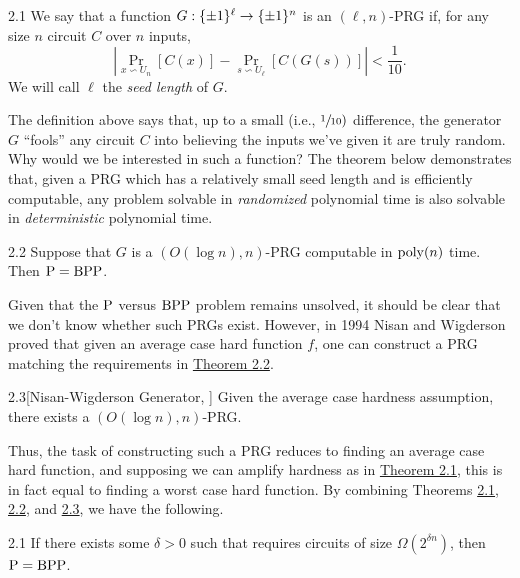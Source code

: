 \documentclass[11pt]{article}
\begin{document}
\begin{definition}{2.1}
    We say that a function $G : \pmo^\ell \rightarrow \pmo^{n}$ is an $(\ell, n)$-PRG if, for any size $n$ circuit $C$ over $n$ inputs, 
    \begin{equation*}
        \left|\Pr_{x \backsim U_n}[C(x)] - \Pr_{s \backsim U_\ell}[C(G(s))]\right| < \frac{1}{10}.
    \end{equation*}
    We will call $\ell$ the \emph{seed length} of $G$.
\end{definition}

The definition above says that, up to a small (i.e., $\sfrac{1}{10})$ difference, the generator $G$ ``fools'' any circuit $C$ into believing the inputs we've given it are truly random. Why would we be interested in such a function? The theorem below demonstrates that, given a PRG which has a relatively small seed length and is efficiently computable, any problem solvable in \emph{randomized} polynomial time is also solvable in \emph{deterministic} polynomial time.

\begin{theorem}{2.2} \label{t-2-2}
    Suppose that $G$ is a $(O(\log n), n)$-PRG computable in $\poly(n)$ time. Then $\P = \BPP$.
\end{theorem}

Given that the $\P$ versus $\BPP$ problem remains unsolved, it should be clear that we don't know whether such PRGs exist. However, in 1994 Nisan and Wigderson \cite{NW94} proved that given an average case hard function $f$, one can construct a PRG matching the requirements in \hyperref[t-2-2]{Theorem 2.2}.

\begin{theorem}{2.3}[Nisan-Wigderson Generator, \cite{NW94}] \label{t-2-3}
    Given the average case hardness assumption, there exists a $(O(\log n), n)$-PRG.
\end{theorem}

Thus, the task of constructing such a PRG reduces to finding an average case hard function, and supposing we can amplify hardness as in \hyperref[t-2-1]{Theorem 2.1}, this is in fact equal to finding a worst case hard function. By combining Theorems \hyperref[t-2-1]{2.1}, \hyperref[t-2-2]{2.2}, and \hyperref[t-2-3]{2.3}, we have the following.

\begin{corollary}{2.1}
    If there exists some $\delta > 0$ such that \SAT{} requires circuits of size $\Omega(2^{\delta n})$, then $\P = \BPP$.
\end{corollary}
\end{document}
